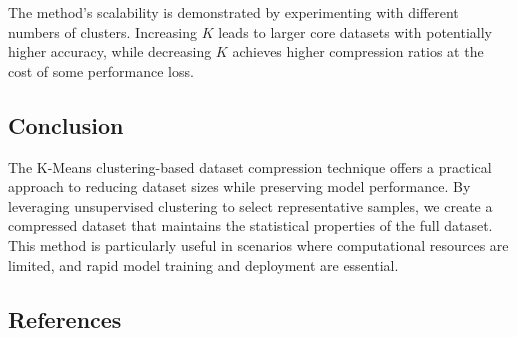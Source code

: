 \documentclass{article}
\begin{document}
The method's scalability is demonstrated by experimenting with different numbers of clusters. Increasing $K$ leads to larger core datasets with potentially higher accuracy, while decreasing $K$ achieves higher compression ratios at the cost of some performance loss.

\subsection{Conclusion}

The K-Means clustering-based dataset compression technique offers a practical approach to reducing dataset sizes while preserving model performance. By leveraging unsupervised clustering to select representative samples, we create a compressed dataset that maintains the statistical properties of the full dataset. This method is particularly useful in scenarios where computational resources are limited, and rapid model training and deployment are essential.

\subsection{References}
\end{document}
